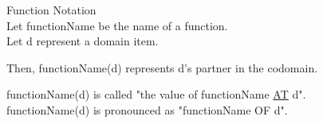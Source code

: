\documentclass{ximera}
\begin{document}
\begin{notation} Function Notation \\
Let functionName be the name of a function. \\
Let d represent a domain item.

Then, functionName(d) represents d's partner in the codomain.

functionName(d) is called "the value of functionName \underline{AT} d". \\
functionName(d) is pronounced as "functionName OF d".
\end{notation}
\end{document}
